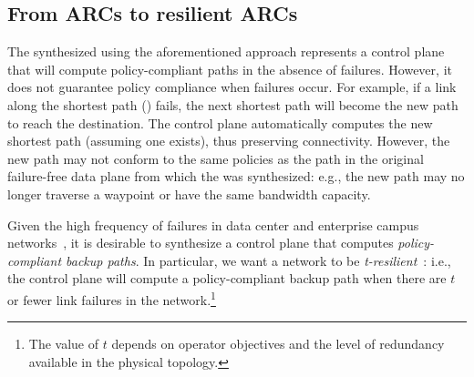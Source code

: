 \subsection{From ARCs to resilient ARCs}

%

The \ARC synthesized using the aforementioned approach represents a
control plane that will compute policy-compliant paths in the absence of
failures. However, it does not guarantee policy compliance when failures occur. For
example, if a link along the shortest path () fails, the next shortest path will become the new path to reach the
destination. The control plane automatically computes the new shortest path
(assuming one exists), thus preserving connectivity. However, the new path may
not conform to the same policies as the path in the original failure-free data
plane from which the \ARC was synthesized: e.g., the new path may no longer
traverse a waypoint or have the same bandwidth capacity.

Given the high frequency of failures in data center and enterprise campus
networks~\cite{datacenterfailures}, it is desirable to synthesize a control plane that
computes {\em policy-compliant backup paths}. In particular, we want a network
to be {\em t-resilient}~\cite{plinko}: i.e., the control plane will compute a
policy-compliant backup path when there are $t$ or fewer link failures in the
network.\footnote{The value of $t$ depends on operator objectives and the
level of redundancy available in the physical topology.}

